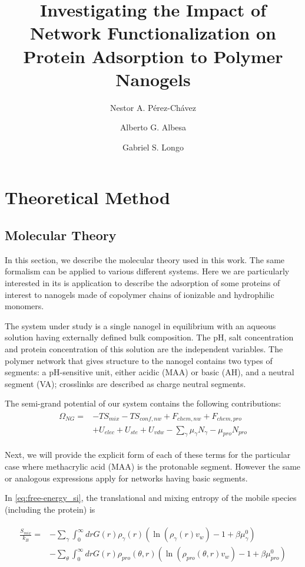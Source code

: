 \documentclass[journal=jacsat,manuscript=suppinfo]{achemso}
\author{Nestor A. P\'erez-Ch\'avez}
\author{Alberto G. Albesa}
\author{Gabriel S. Longo}
\affiliation[INIFTA]
{Instituto de Investigaciones Fisicoqu\'imicas, Te\'oricas y Aplicadas (INIFTA), UNLP-CONICET, La Plata, Argentina}
\title[]
{Investigating the Impact of Network Functionalization on Protein Adsorption to Polymer Nanogels}
\begin{document}
\tableofcontents

\section{Theoretical Method}

\subsection{Molecular Theory}\label{sec:si:TM}
In this section, we describe the molecular theory used in this work.
The same formalism can be applied to various different systems. 
Here we are particularly interested in  its is application to describe the adsorption of some proteins of interest to nanogels  made of copolymer chains of ionizable and hydrophilic monomers.

The system under study is a single nanogel in equilibrium with an aqueous solution having externally defined bulk composition.
The pH, salt concentration and protein concentration of this solution are the independent variables.
The polymer network that gives structure to the nanogel  contains two types of segments: a pH-sensitive unit, either acidic (MAA) or basic (AH), and a neutral segment (VA); 
crosslinks are described as charge neutral segments.

The semi-grand potential of our system contains the following contributions:
\begin{align}
	\begin{aligned}
		\Omega_{NG}=& -TS_{mix} -TS_{conf,nw} + F_{chem,nw} + F_{chem,pro}\\
		& + U_{elec} + U_{ste} + U_{vdw} - \sum_{\gamma}{\mu_\gamma N_\gamma} - \mu_{pro} N_{pro}
		\label{eq:free-energy_si}
	\end{aligned}
\end{align}

Next, we will provide the explicit form of each of these terms for the particular case where  methacrylic acid (MAA) is the protonable segment.
However the same or analogous expressions apply for networks having  basic segments.

In \cref{eq:free-energy_si}, the translational and mixing entropy of the mobile species (including the protein) is

\begin{align}
	\begin{aligned}
		\frac{S_{mix}}{k_B}= &-\sum_{\gamma}\int_0^\infty{dr G(r)\rho_\gamma(r)\left(\ln \left(\rho_\gamma (r)v_w\right) -1 + \beta\mu^0_\gamma\right)} \\
		&- \sum_{\theta}\int_0^\infty{dr G(r)\rho_{pro}(\theta,r)\left(\ln \left(\rho_{pro}(\theta,r)v_w\right) -1 + \beta\mu^0_{pro} \right)}
	\end{aligned}\label{eq:Smix_si}
\end{align}
\end{document}
